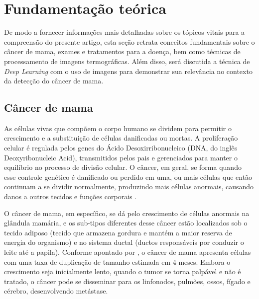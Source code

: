 

\section{\esp Fundamentação teórica}  \label{fundteorica}

De modo a fornecer informações mais detalhadas sobre os tópicos vitais para a compreensão do presente artigo, esta seção retrata conceitos fundamentais sobre o câncer de mama, exames e tratamentos para a doença, bem como técnicas de processamento de imagens termográficas. Além disso, será discutida a técnica de \textit{Deep Learning} com o uso de imagens para demonstrar sua relevância no contexto da detecção do câncer de mama.




\subsection{\esp Câncer de mama} \label{cancerdemama}
As células vivas que compõem o corpo humano se dividem para permitir o crescimento e a substituição de células danificadas ou mortas. A proliferação celular é regulada pelos genes do Ácido Desoxirribonucleico (DNA, do inglês Deoxyribonucleic Acid), transmitidos pelos pais e gerenciados para manter o equilíbrio no processo de divisão celular. O câncer, em geral, se forma quando esse controle genético é danificado ou perdido em uma, ou mais células que então continuam a se dividir normalmente, produzindo mais células anormais, causando danos a outros tecidos e funções corporais \cite{basicOncology}.

O câncer de mama, em específico, se dá pelo crescimento de células anormais na glândula mamária, e os sub-tipos diferentes desse câncer estão localizados sob o tecido adiposo (tecido que armazena gordura e mantém a maior reserva de energia do organismo) e no sistema ductal (ductos responsáveis por conduzir o leite até a papila). Conforme apontado por , o câncer de mama apresenta células com uma taxa de duplicação de tamanho estimada em 4 meses. Embora o crescimento seja inicialmente lento, quando o tumor se torna palpável e não é tratado, o câncer pode se disseminar para os linfonodos, pulmões, ossos, fígado e cérebro, desenvolvendo metástase.

